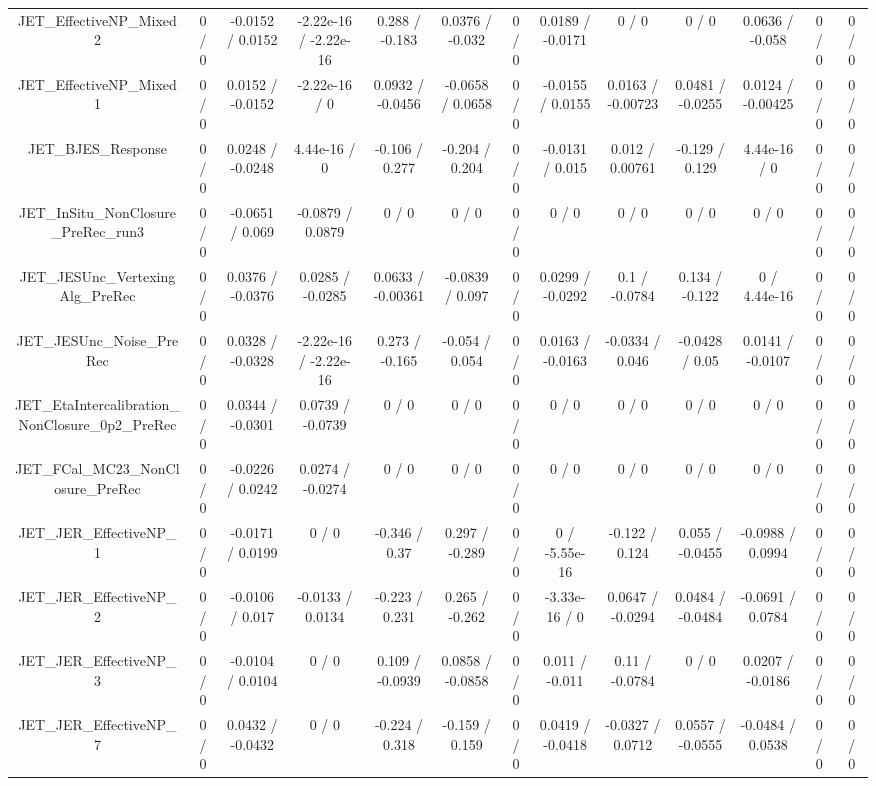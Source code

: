 \documentclass[10pt]{article}
\begin{document}
\begin{table}[htbp]
\begin{center}
\begin{tabular}{|c|c|c|c|c|c|c|c|c|c|c|c|c|}
  JET_EffectiveNP_Mixed2 & 0 / 0 & -0.0152 / 0.0152 & -2.22e-16 / -2.22e-16 & 0.288 / -0.183 & 0.0376 / -0.032 & 0 / 0 & 0.0189 / -0.0171 & 0 / 0 & 0 / 0 & 0.0636 / -0.058 & 0 / 0 & 0 / 0 \\ 
  JET_EffectiveNP_Mixed1 & 0 / 0 & 0.0152 / -0.0152 & -2.22e-16 / 0 & 0.0932 / -0.0456 & -0.0658 / 0.0658 & 0 / 0 & -0.0155 / 0.0155 & 0.0163 / -0.00723 & 0.0481 / -0.0255 & 0.0124 / -0.00425 & 0 / 0 & 0 / 0 \\ 
  JET_BJES_Response & 0 / 0 & 0.0248 / -0.0248 & 4.44e-16 / 0 & -0.106 / 0.277 & -0.204 / 0.204 & 0 / 0 & -0.0131 / 0.015 & 0.012 / 0.00761 & -0.129 / 0.129 & 4.44e-16 / 0 & 0 / 0 & 0 / 0 \\ 
  JET_InSitu_NonClosure_PreRec_run3 & 0 / 0 & -0.0651 / 0.069 & -0.0879 / 0.0879 & 0 / 0 & 0 / 0 & 0 / 0 & 0 / 0 & 0 / 0 & 0 / 0 & 0 / 0 & 0 / 0 & 0 / 0 \\ 
  JET_JESUnc_VertexingAlg_PreRec & 0 / 0 & 0.0376 / -0.0376 & 0.0285 / -0.0285 & 0.0633 / -0.00361 & -0.0839 / 0.097 & 0 / 0 & 0.0299 / -0.0292 & 0.1 / -0.0784 & 0.134 / -0.122 & 0 / 4.44e-16 & 0 / 0 & 0 / 0 \\ 
  JET_JESUnc_Noise_PreRec & 0 / 0 & 0.0328 / -0.0328 & -2.22e-16 / -2.22e-16 & 0.273 / -0.165 & -0.054 / 0.054 & 0 / 0 & 0.0163 / -0.0163 & -0.0334 / 0.046 & -0.0428 / 0.05 & 0.0141 / -0.0107 & 0 / 0 & 0 / 0 \\ 
  JET_EtaIntercalibration_NonClosure_0p2_PreRec & 0 / 0 & 0.0344 / -0.0301 & 0.0739 / -0.0739 & 0 / 0 & 0 / 0 & 0 / 0 & 0 / 0 & 0 / 0 & 0 / 0 & 0 / 0 & 0 / 0 & 0 / 0 \\ 
  JET_FCal_MC23_NonClosure_PreRec & 0 / 0 & -0.0226 / 0.0242 & 0.0274 / -0.0274 & 0 / 0 & 0 / 0 & 0 / 0 & 0 / 0 & 0 / 0 & 0 / 0 & 0 / 0 & 0 / 0 & 0 / 0 \\ 
  JET_JER_EffectiveNP_1 & 0 / 0 & -0.0171 / 0.0199 & 0 / 0 & -0.346 / 0.37 & 0.297 / -0.289 & 0 / 0 & 0 / -5.55e-16 & -0.122 / 0.124 & 0.055 / -0.0455 & -0.0988 / 0.0994 & 0 / 0 & 0 / 0 \\ 
  JET_JER_EffectiveNP_2 & 0 / 0 & -0.0106 / 0.017 & -0.0133 / 0.0134 & -0.223 / 0.231 & 0.265 / -0.262 & 0 / 0 & -3.33e-16 / 0 & 0.0647 / -0.0294 & 0.0484 / -0.0484 & -0.0691 / 0.0784 & 0 / 0 & 0 / 0 \\ 
  JET_JER_EffectiveNP_3 & 0 / 0 & -0.0104 / 0.0104 & 0 / 0 & 0.109 / -0.0939 & 0.0858 / -0.0858 & 0 / 0 & 0.011 / -0.011 & 0.11 / -0.0784 & 0 / 0 & 0.0207 / -0.0186 & 0 / 0 & 0 / 0 \\ 
  JET_JER_EffectiveNP_7 & 0 / 0 & 0.0432 / -0.0432 & 0 / 0 & -0.224 / 0.318 & -0.159 / 0.159 & 0 / 0 & 0.0419 / -0.0418 & -0.0327 / 0.0712 & 0.0557 / -0.0555 & -0.0484 / 0.0538 & 0 / 0 & 0 / 0 \\ 

\end{tabular}
\end{center}
\end{table}
\end{document}
